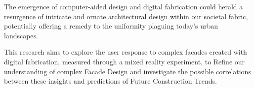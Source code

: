 







The emergence of computer-aided design and digital fabrication could herald a resurgence of intricate and ornate architectural design within our societal fabric, potentially offering a remedy to the uniformity plaguing today's urban landscapes.

This research aims to explore the user response to complex facades created with digital fabrication, measured through a mixed reality experiment, to Refine our understanding of complex Facade Design and investigate the possible correlations between these insights and predictions of Future Construction Trends.

